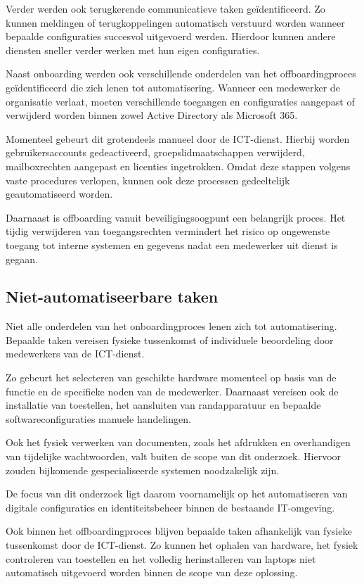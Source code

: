 Verder werden ook terugkerende communicatieve taken geïdentificeerd. Zo kunnen meldingen of terugkoppelingen automatisch verstuurd worden wanneer bepaalde configuraties succesvol uitgevoerd werden. Hierdoor kunnen andere diensten sneller verder werken met hun eigen configuraties.\newline

Naast onboarding werden ook verschillende onderdelen van het offboardingproces geïdentificeerd die zich lenen tot automatisering. Wanneer een medewerker de organisatie verlaat, moeten verschillende toegangen en configuraties aangepast of verwijderd worden binnen zowel Active Directory als Microsoft 365.

Momenteel gebeurt dit grotendeels manueel door de ICT-dienst. Hierbij worden gebruikersaccounts gedeactiveerd, groepslidmaatschappen verwijderd, mailboxrechten aangepast en licenties ingetrokken. Omdat deze stappen volgens vaste procedures verlopen, kunnen ook deze processen gedeeltelijk geautomatiseerd worden.

Daarnaast is offboarding vanuit beveiligingsoogpunt een belangrijk proces. Het tijdig verwijderen van toegangsrechten vermindert het risico op ongewenste toegang tot interne systemen en gegevens nadat een medewerker uit dienst is gegaan.


\subsection{Niet-automatiseerbare taken}

Niet alle onderdelen van het onboardingproces lenen zich tot automatisering. Bepaalde taken vereisen fysieke tussenkomst of individuele beoordeling door medewerkers van de ICT-dienst.

Zo gebeurt het selecteren van geschikte hardware momenteel op basis van de functie en de specifieke noden van de medewerker. Daarnaast vereisen ook de installatie van toestellen, het aansluiten van randapparatuur en bepaalde softwareconfiguraties manuele handelingen.

Ook het fysiek verwerken van documenten, zoals het afdrukken en overhandigen van tijdelijke wachtwoorden, valt buiten de scope van dit onderzoek. Hiervoor zouden bijkomende gespecialiseerde systemen noodzakelijk zijn.

De focus van dit onderzoek ligt daarom voornamelijk op het automatiseren van digitale configuraties en identiteitsbeheer binnen de bestaande IT-omgeving.

Ook binnen het offboardingproces blijven bepaalde taken afhankelijk van fysieke tussenkomst door de ICT-dienst. Zo kunnen het ophalen van hardware, het fysiek controleren van toestellen en het volledig herinstalleren van laptops niet automatisch uitgevoerd worden binnen de scope van deze oplossing.


